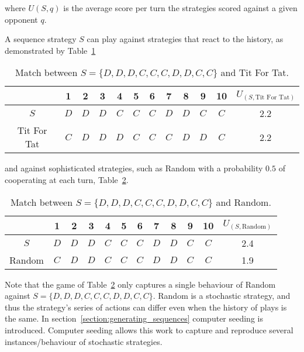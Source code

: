 where \(U(S, q)\) is the average score per turn the strategies scored against a
given opponent \(q\).

A sequence strategy \(S\) can play against strategies that react to the history,
as demonstrated by Table~\ref{table:s_vs_tft}

\begin{table}[htb]
\centering
\begin{tabular}{cccccccccccc}
    & \textbf{1} & \textbf{2} & \textbf{3} & \textbf{4}  & \textbf{5} & \textbf{6} & \textbf{7} & \textbf{8}  & \textbf{9} & \textbf{10} &
    \(U_{(S, \text{Tit For Tat})}\) \\ \midrule
    \(S\) & \(D\) & \(D\) & \(D\) & \(C\) & \(C\) & \(C\) & \(D\) & \(D\) & \(C\) & \(C\) & 2.2 \\
    Tit For Tat & \(C\) & \(D\) & \(D\) & \(D\) & \(C\) & \(C\) & \(C\) & \(D\) & \(D\) & \(C\) & 2.2 \\ \bottomrule
\end{tabular}
\caption{Match between \(S = \{D, D, D, C, C, C, D, D, C, C\}\) and Tit For Tat.}\label{table:s_vs_tft}
\end{table}

and against sophisticated strategies, such as Random with a probability \(0.5\)
of cooperating at each turn, Table~\ref{table:s_vs_random}.

\begin{table}[htb]
\centering
\begin{tabular}{cccccccccccc}
    & \textbf{1} & \textbf{2} & \textbf{3} & \textbf{4}  & \textbf{5} & \textbf{6} & \textbf{7} & \textbf{8}  & \textbf{9} & \textbf{10} &
    \(U_{(S, \text{Random})}\) \\ \midrule
    \(S\) & \(D\) & \(D\) & \(D\) & \(C\) & \(C\) & \(C\) & \(D\) & \(D\) & \(C\) & \(C\) & 2.4 \\
    Random & \(C\) & \(D\) & \(D\) & \(C\) & \(C\) & \(C\) & \(D\) & \(D\) & \(C\) & \(C\) & 1.9 \\ \bottomrule
\end{tabular}
\caption{Match between \(S = \{D, D, D, C, C, C, D, D, C, C\}\) and Random.}\label{table:s_vs_random}
\end{table}

Note that the game of Table~\ref{table:s_vs_random} only captures a single
behaviour of Random against \(S = \{D, D, D, C, C, C, D, D, C, C\}\). Random is
a stochastic strategy, and thus the strategy's series of actions can differ even
when the history of plays is the same. In
section~\ref{section:generating_sequences} computer seeding is introduced.
Computer seeding allows this work to capture and reproduce several
instances/behaviour of stochastic strategies.

